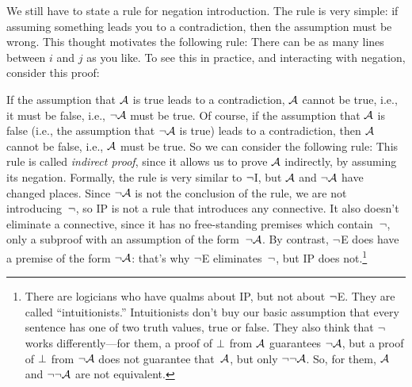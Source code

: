 We still have to state a rule for negation introduction. The rule is very simple: if assuming something leads you to a contradiction, then the assumption must be wrong. This thought motivates the following rule:
There can be as many lines between $i$ and $j$ as you like. To see this in practice, and interacting with negation, consider this proof:
	\begin{fitchproof}
		\AS
		\open
			\AS
		\close
	\end{fitchproof}

If the assumption that $\mathcal{A}$ is true leads to a contradiction, $\mathcal{A}$ cannot be true, i.e., it must be false, i.e., $\neg\mathcal{A}$ must be true. Of course, if the assumption that $\mathcal{A}$ is false (i.e., the assumption that $\neg\mathcal{A}$ is true) leads to a contradiction, then $\mathcal{A}$ cannot be false, i.e., $\mathcal{A}$ must be true. So we can consider the following rule:
This rule is called \emph{indirect proof}, since it allows us to prove $\mathcal{A}$ indirectly, by assuming its negation. Formally, the rule is very similar to $\neg$I, but $\mathcal{A}$ and $\neg\mathcal{A}$ have changed places. Since $\neg\mathcal{A}$ is not the conclusion of the rule, we are not introducing~$\neg$, so IP is not a rule that introduces any connective. It also doesn't eliminate a connective, since it has no free-standing premises which contain~$\neg$, only a subproof with an assumption of the form~$\neg\mathcal{A}$. By contrast, $\neg$E does have a premise of the form $\neg\mathcal{A}$: that's why $\neg$E eliminates~$\neg$, but IP does not.\footnote{There are logicians who have qualms about IP, but not about $\neg$E. They are called ``intuitionists.'' Intuitionists don't buy our basic assumption that every sentence has one of two truth values, true or false. They also think that $\neg$ works differently---for them, a proof of $\bot$ from $\mathcal{A}$ guarantees $\neg \mathcal{A}$, but a proof of $\bot$ from $\neg\mathcal{A}$ does not guarantee that~$\mathcal{A}$, but only $\neg\neg\mathcal{A}$. So, for them, $\mathcal{A}$ and $\neg\neg\mathcal{A}$ are not equivalent.}

